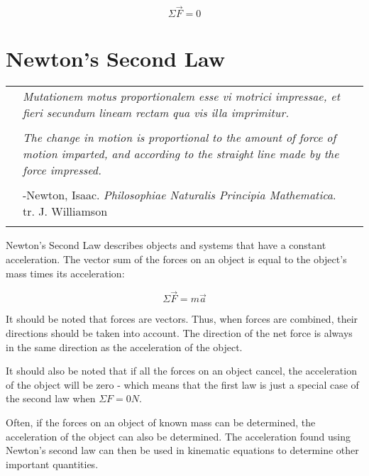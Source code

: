 				\begin{mdframed}[backgroundcolor=orange!20!white]
		\begin{equation}
			\Sigma \vec{F} = 0  
			\label{eqn:newtonsfirst}
		\end{equation}
	\end{mdframed}

\newpage

	
	\section{Newton's Second Law}
		\begin{tabular}{p{.75in} p{4.5in} p{.75in}}
		& \textit{Mutationem motus proportionalem esse vi motrici impressae, et fieri secundum lineam rectam qua vis illa imprimitur.} &  \\
		& & \\
		& \textit{The change in motion is proportional to the amount of force of motion imparted, and according to the straight line made by the force impressed. } & \\ 
		& & \\
		 & {-Newton, Isaac.  \textit{Philosophiae Naturalis Principia Mathematica}.  tr. J. Williamson} & \\		
		 	& & \\
	\end{tabular}

Newton's Second Law describes objects and systems that have a constant acceleration.  The vector sum of the forces on an object is equal to the object's mass times its acceleration:

				\begin{mdframed}[backgroundcolor=orange!20!white]
	\begin{equation}
		\Sigma \vec{F} = m \vec{a}  
		\label{eqn:newtonssecond}
	\end{equation}
\end{mdframed}
	
	It should be noted that forces are vectors.  Thus, when forces are combined, their directions should be taken into account.  The direction of the net force is always in the same direction as the acceleration of the object. 
	
	It should also be noted that if all the forces on an object cancel, the acceleration of the object will be zero - which means that the first law is just a special case of the second law when $\Sigma F = 0 N$.
	
	Often, if the forces on an object of known mass can be determined, the acceleration of the object can also be determined.  The acceleration found using Newton's second law can then be used in kinematic equations to determine other important quantities. 
	
